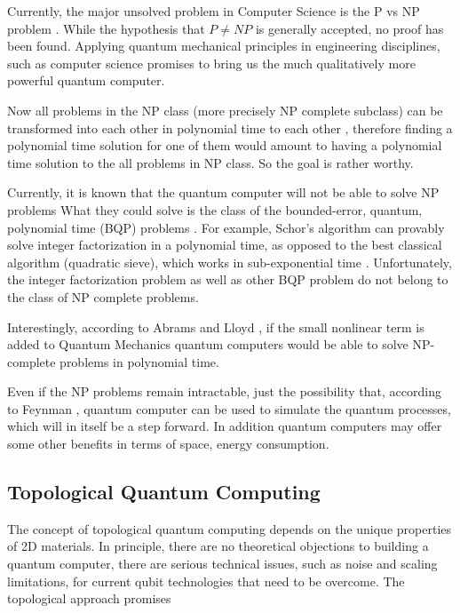Currently, the major unsolved problem in Computer Science is the P vs NP problem \cite{PvsNP}. While the hypothesis that $ P \neq NP $ is generally accepted, no proof has been found. Applying quantum mechanical principles in engineering disciplines, such as computer science \cite{FQC} promises to bring us the much qualitatively more powerful quantum computer. 

 Now all problems in the NP class (more precisely NP complete subclass) can be transformed into each other in polynomial time to each other \cite{NPComplete},  therefore finding a polynomial time solution for one of them would amount to having a polynomial time solution to the all problems in NP class. So the goal is rather worthy. 

Currently, it is known that the quantum computer will not be able to solve NP problems  What they could solve is the class of the bounded-error, quantum, polynomial time (BQP) problems \cite{BQP}. 
For example, Schor's algorithm \cite{Schor} can provably solve integer factorization in a polynomial time, as opposed to the best classical algorithm (quadratic sieve), which works in sub-exponential time \cite{Pomerance}. Unfortunately, the integer factorization problem as well as other BQP problem do not belong to the class of NP complete problems. 

Interestingly, according to Abrams and Lloyd \cite{Abrams_1998}, \cite{Abrams_1999} if the small nonlinear term is added to Quantum Mechanics quantum computers would be able to solve NP-complete problems in polynomial time.

Even if the NP problems remain intractable, just the possibility that, according to Feynman \cite{FQC}, quantum computer can be used to simulate the quantum processes, which will in itself be a step forward. In addition quantum computers may offer some other benefits in terms of space, energy consumption. 

\subsection*{Topological Quantum Computing}
The concept of topological quantum computing \cite{Tqc1}
depends on the unique properties of 2D materials.  In principle, there are no theoretical objections to building a quantum computer, there are serious technical issues, such as noise
and scaling limitations, for current qubit technologies
that need to be overcome\cite{QCProblems}. 
The topological approach promises 

